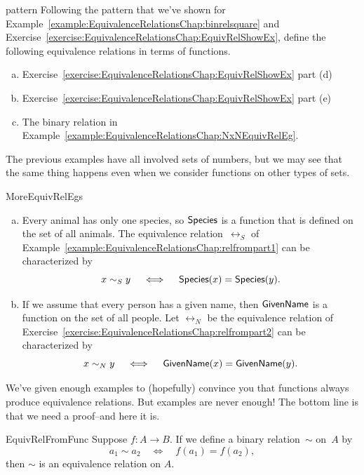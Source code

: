\begin{exercise}{pattern}
Following the pattern that we've shown for Example~\ref{example:EquivalenceRelationsChap:binrelsquare}  and Exercise~\ref{exercise:EquivalenceRelationsChap:EquivRelShowEx},
define the following equivalence relations in terms of functions.
\begin{enumerate}[(a)]
\item
Exercise~\ref{exercise:EquivalenceRelationsChap:EquivRelShowEx} part (d) 
\item
Exercise~\ref{exercise:EquivalenceRelationsChap:EquivRelShowEx} part (e) 
\item
The binary relation in   Example~\ref{example:EquivalenceRelationsChap:NxNEquivRelEg}.
\end{enumerate}
\end{exercise}


The previous examples have all involved sets of numbers, but we may see that the same thing happens even when we consider functions on other types of sets.

\begin{example}{MoreEquivRelEgs}
\begin{enumerate}[(a)]
\item Every animal has only one species, so $\sf{Species}$ is a function that is defined on the set of all animals. The equivalence relation~$\rel_S$ of Example~\ref{example:EquivalenceRelationsChap:relfrompart1} can be characterized by
\[ x \sim_S y \quad \iff \quad {\sf{S}pecies}(x) = {\sf{S}pecies}(y) .\]
\item If we assume that every person has a given name, then $\sf{GivenName}$ is a function on the set of all people. Let $\rel_N$ be the equivalence relation of Exercise~\ref{exercise:EquivalenceRelationsChap:relfrompart2} can be characterized by
\[  x \sim_N y \quad \iff \quad {\sf{G}ivenName}(x) = {\sf{G}ivenName}(y) .\]
\end{enumerate}
\end{example}

We've given enough examples to (hopefully) convince you that functions always produce equivalence relations. But examples are never enough! The bottom line is that we need a proof--and here it is.

\begin{prop}{EquivRelFromFunc}
Suppose $f \colon A \to B$. If we define a binary relation~$\sim$ on~$A$ by
\[ a_1 \sim a_2 \quad \iff \quad f(a_1) = f(a_2) ,\]
then $\sim$ is an equivalence relation on $A$.
\end{prop}

